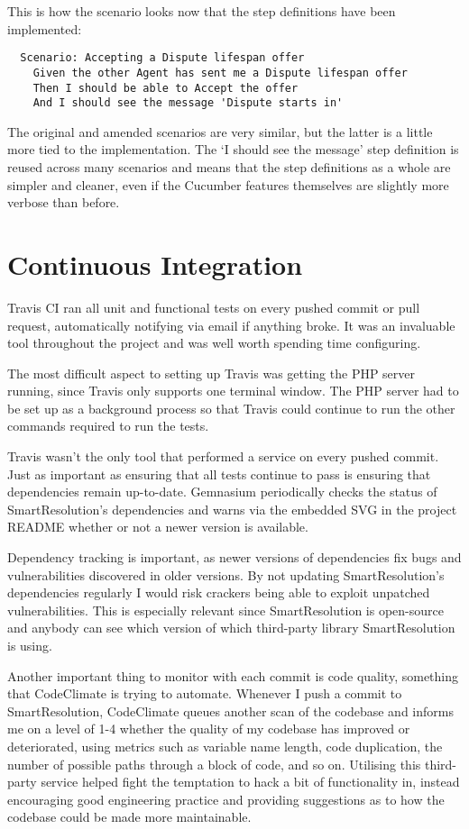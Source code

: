 This is how the scenario looks now that the step definitions have been implemented:

\begin{lstlisting}
  Scenario: Accepting a Dispute lifespan offer
    Given the other Agent has sent me a Dispute lifespan offer
    Then I should be able to Accept the offer
    And I should see the message 'Dispute starts in'
\end{lstlisting}

The original and amended scenarios are very similar, but the latter is a little more tied to the implementation. The `I should see the message' step definition is reused across many scenarios and means that the step definitions as a whole are simpler and cleaner, even if the Cucumber features themselves are slightly more verbose than before.

\section{Continuous Integration}

Travis CI ran all unit and functional tests on every pushed commit or pull request, automatically notifying via email if anything broke. It was an invaluable tool throughout the project and was well worth spending time configuring.

The most difficult aspect to setting up Travis was getting the PHP server running, since Travis only supports one terminal window. The PHP server had to be set up as a background process so that Travis could continue to run the other commands required to run the tests.

Travis wasn't the only tool that performed a service on every pushed commit. Just as important as ensuring that all tests continue to pass is ensuring that dependencies remain up-to-date. Gemnasium periodically checks the status of SmartResolution's dependencies and warns via the embedded SVG in the project README whether or not a newer version is available.

Dependency tracking is important, as newer versions of dependencies fix bugs and vulnerabilities discovered in older versions. By not updating SmartResolution's dependencies regularly I would risk crackers being able to exploit unpatched vulnerabilities. This is especially relevant since SmartResolution is open-source and anybody can see which version of which third-party library SmartResolution is using.

Another important thing to monitor with each commit is code quality, something that CodeClimate is trying to automate. Whenever I push a commit to SmartResolution, CodeClimate queues another scan of the codebase and informs me on a level of 1-4 whether the quality of my codebase has improved or deteriorated, using metrics such as variable name length, code duplication, the number of possible paths through a block of code, and so on. Utilising this third-party service helped fight the temptation to hack a bit of functionality in, instead encouraging good engineering practice and providing suggestions as to how the codebase could be made more maintainable.

